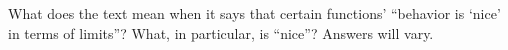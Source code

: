 {What does the text mean when it says that certain functions' ``behavior is `nice' in terms of limits''? What, in particular, is ``nice''?}
{Answers will vary.
}
